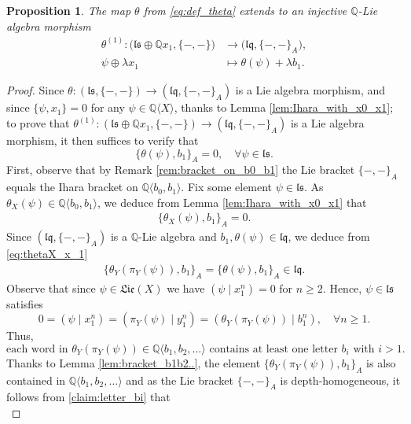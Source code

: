 \documentclass[11pt, a4paper]{amsart}
\newtheorem{proposition}[theorem]{Proposition}
\numberwithin{equation}{section}
\theoremstyle{definition}
\newcommand{\Q}{\mathbb{Q}}
\newcommand{\QX}{\Q\langle X\rangle}
\newcommand{\ls}{\mathfrak{ls}}
\newcommand{\lqq}{\mathfrak{lq}}
\newcommand{\Lie}{\mathfrak{Lie}}
\begin{document}
\begin{proposition} \label{prop:theta_ex}
The map $\theta$ from \eqref{eq:def_theta} extends to an injective $\Q$-Lie algebra morphism
\begin{align*}
\theta^{(1)} : \big(\ls \oplus \Q x_1, \{-,-\}\big) & \to \big(\lqq, \{-,-\}_A \big), \\
\psi \oplus \lambda x_1 & \mapsto \theta(\psi) + \lambda b_1.
\end{align*}
\end{proposition}
\begin{proof}
Since $\theta : (\ls, \{-, -\}) \to (\lqq, \{-, -\}_A)$ is a Lie algebra morphism, and since $\{\psi,x_1\}=0$ for any $\psi\in\QX$, thanks to Lemma \ref{lem:Ihara_with_x0_x1}; to prove that $\theta^{(1)} : (\ls \oplus \Q x_1, \{-, -\}) \to (\lqq, \{-, -\}_A)$ is a Lie algebra morphism, it then suffices to verify that
\[
    \{\theta(\psi),b_1\}_A=0, \quad \forall \psi \in \ls.
\]
First, observe that by Remark \ref{rem:bracket_on_b0_b1} the Lie bracket $\{-,-\}_A$ equals the Ihara bracket on $\Q\langle b_0,b_1\rangle$. \newline
Fix some element $\psi \in \ls$. As $\theta_X(\psi)\in \Q\langle b_0,b_1\rangle$, we deduce from Lemma \ref{lem:Ihara_with_x0_x1} that
\begin{align} \label{eq:thetaX_x_1} 
\{\theta_X(\psi),b_1\}_A=0.
\end{align}
Since $(\lqq,\{-,-\}_A)$ is a $\Q$-Lie algebra and $b_1, \theta(\psi)\in \lqq$, we deduce from \eqref{eq:thetaX_x_1}
\begin{align} \label{eq:(thetaY(phi),b1)_in_lq}
\{\theta_Y(\pi_Y(\psi)), b_1\}_A = \{\theta(\psi), b_1\}_A \in \lqq.
\end{align}
Observe that since $\psi \in \Lie(X)$ we have $(\psi\mid x_1^n)=0$ for $n\geq2$. Hence, $\psi\in\ls$ satisfies 
\[
    0 = (\psi \mid x_1^n) = (\pi_Y(\psi) \mid y_1^n) = (\theta_Y(\pi_Y(\psi)) \mid b_1^n), \quad \forall n \geq 1.
\]
Thus,
\begin{equation} \label{claim:letter_bi}
    \text{each word in } \theta_Y(\pi_Y(\psi))\in \Q\langle b_1,b_2,\ldots\rangle \text{ contains at least one letter } b_i \text{ with } i>1.
\end{equation}
Thanks to Lemma \ref{lem:bracket_b1b2..}, the element $\{\theta_Y(\pi_Y(\psi)),b_1\}_A$ is also contained in $\Q\langle b_1,b_2,\dots\rangle$ and as the Lie bracket $\{-,-\}_A$ is depth-homogeneous, it follows from \eqref{claim:letter_bi} that
\begin{equation} \label{claim:bracket_letter_bi}

\end{equation}
\end{proof}
\end{document}
